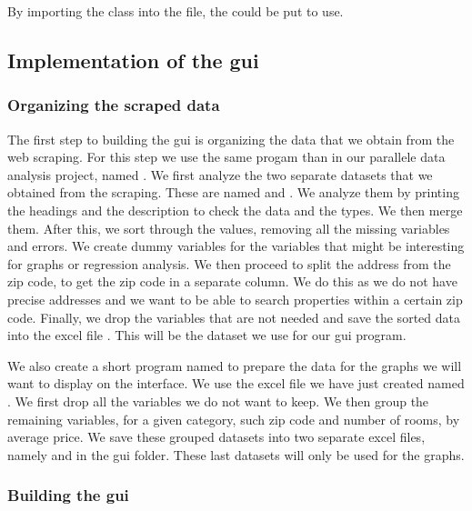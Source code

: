 \documentclass[main]{subfiles}
\begin{document}
By importing the class \pkg[ComparisWebscraperItem] into the  file, the \pkg[ItemLoader] 
could be put to use.

\subsection{Implementation of the \ac{gui}}

\subsubsection{Organizing the scraped data}
The first step to building the \ac{gui} is organizing the data that we obtain from the web scraping.
For this step we use the same progam than in our parallele data analysis project, named .
We first analyze the two separate datasets that we obtained from the scraping. 
These are named  and .
We analyze them by printing the headings and the description to check the data and the types.
We then merge them. After this, we sort through the values, removing all the missing variables and errors. 
We create dummy variables for the variables that might be interesting for graphs or regression analysis.
We then proceed to split the address from the zip code, to get the zip code in a separate column. 
We do this as we do not have precise addresses and we want to be able to search properties within a certain zip code. 
Finally, we drop the variables that are not needed and save the sorted data into the excel file .
This will be the dataset we use for our \ac{gui} program. \par
We also create a short program named  to prepare the data for the graphs 
we will want to display on the interface. We use the excel file we have just created named .
We first drop all the variables we do not want to keep. 
We then group the remaining variables, for a given category, such zip code and number of rooms, by average price.
We save these grouped datasets into two separate excel files, namely  and  in the \ac{gui} folder.
These last datasets will only be used for the graphs.\par


\vspace*{5pt}
\subsubsection{Building the \ac{gui}}
\end{document}
